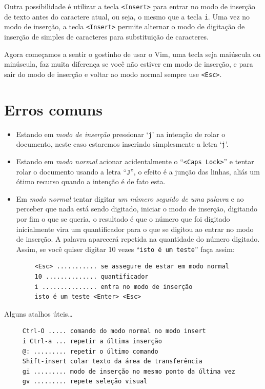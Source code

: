 Outra possibilidade é utilizar a tecla \verb|<Insert>| para entrar no modo de inserção de
texto antes do caractere atual, ou seja, o mesmo que a tecla \verb|i|. Uma vez no modo de 
inserção, a tecla \verb|<Insert>| permite alternar o modo de digitação de inserção de 
simples de caracteres para substituição de caracteres.

Agora começamos a sentir o gostinho de usar o Vim, uma tecla seja
maiúscula ou minúscula, faz muita diferença se você não estiver em
modo de inserção, e para sair do modo de inserção e voltar ao modo normal sempre 
use \verb|<Esc>|.

\section{Erros comuns}\label{sec:Erros comuns}
\begin{itemize}

\item Estando em {\em{modo de inserção}} pressionar `{\tt j}' na intenção
de rolar o documento, neste caso estaremos inserindo simplesmente a letra `{\tt j}'. 

\item Estando em {\em{modo normal}} acionar acidentalmente o ``\verb+<Caps Lock>+'' 
e tentar rolar o documento usando a letra ``\verb+J+'', o efeito é a
junção das linhas, aliás um ótimo recurso quando a intenção é de fato esta.

\item Em {\em{modo normal}} tentar digitar {\em{um número seguido de uma palavra}} e ao perceber que 
nada está sendo digitado, iniciar o modo de inserção, digitando por fim o que se queria, 
o resultado é que o número que foi digitado inicialmente vira um quantificador para o que 
se digitou ao entrar no modo de inserção. A palavra aparecerá repetida na quantidade do 
número digitado. Assim, se você quiser digitar 10 vezes ``\verb+isto é um teste+''
 faça assim:

\begin{verbatim}
     <Esc> ........... se assegure de estar em modo normal
     10 .............. quantificador
     i ............... entra no modo de inserção
     isto é um teste <Enter> <Esc>  
\end{verbatim}

\end{itemize}

{\Large {}} Alguns atalhos úteis\dots
{}
\begin{verbatim}
     Ctrl-O ..... comando do modo normal no modo insert
     i Ctrl-a ... repetir a última inserção
     @: ......... repetir o último comando
     Shift-insert colar texto da área de transferência
     gi ......... modo de inserção no mesmo ponto da última vez
     gv ......... repete seleção visual
\end{verbatim}

